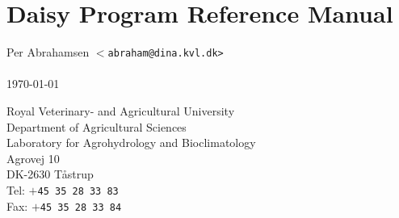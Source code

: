
\chapter*{Daisy Program Reference Manual}

\begin{bf}
  \begin{large}
    Per Abrahamsen \texttt{$<$abraham@dina.kvl.dk>}\\
    \\
    \today{}\\
  \end{large}
\end{bf}
\vspace{10cm}
Royal Veterinary- and Agricultural University\\
Department of Agricultural Sciences\\
Laboratory for Agrohydrology and Bioclimatology\\
Agrovej 10\\
DK-2630 T{\aa}strup\\
Tel: \texttt{$+$45 35 28 33 83}\\
Fax: \texttt{$+$45 35 28 33 84}


